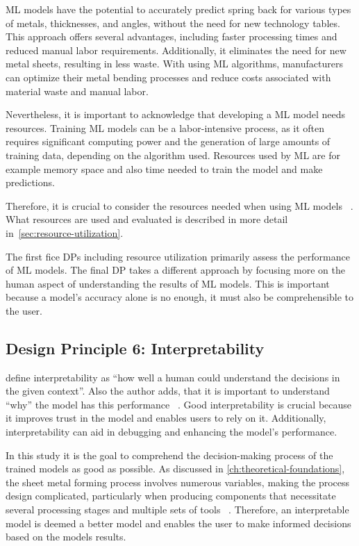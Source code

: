 ML models have the potential to accurately predict spring back for various types of metals,
thicknesses, and angles, without the need for new technology tables.
This approach offers several advantages, including faster processing times and reduced manual labor requirements.
Additionally, it eliminates the need for new metal sheets, resulting in less waste.
With using \ac{ML} algorithms, manufacturers can optimize
their metal bending processes and reduce costs associated with material waste and manual labor.

Nevertheless, it is important to acknowledge that developing a \ac{ML} model needs resources.
Training \ac{ML} models can be a labor-intensive process, as it often requires significant
computing power and the generation of large amounts of training data, depending on the algorithm used.
Resources used by \ac{ML} are for example memory space and also time needed to train the model and make predictions.

Therefore, it is crucial to consider the resources needed when using \ac{ML} models
~\cite[p. 16]{siebert2022construction}.
What resources are used and evaluated is described in more detail in~\cref{sec:resource-utilization}.

The first fice \ac{DP}s including resource utilization primarily assess the performance of \ac{ML} models.
The final \ac{DP} takes a different approach by focusing more on the human aspect of understanding the results of
\ac{ML} models.
This is important because a model's accuracy alone is no enough, it must also be comprehensible to the user.


\subsection*{Design Principle 6: Interpretability}
\cite{miller2019explanation} define interpretability as ``how well a human could understand the decisions in the
given context''.
Also the author adds, that it is important to understand ``why'' the model has this performance
~\cite[p. 1]{miller2019explanation}.
Good interpretability is crucial because it improves trust in the model and enables users to rely on it.
Additionally, interpretability can aid in debugging and enhancing the model's performance.

In this study it is the goal to comprehend the decision-making process of the trained models as good as possible.
As discussed in \cref{ch:theoretical-foundations}, the sheet metal forming process involves numerous
variables, making the process design complicated, particularly when producing components that necessitate several
processing stages and multiple sets of tools
~\cite[p. 1]{dib2020single}.
Therefore, an interpretable model is deemed a better model and enables the user to make informed decisions based
on the models results.


